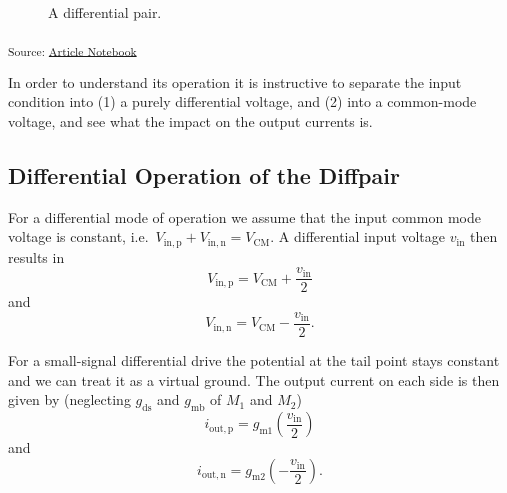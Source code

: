 \documentclass[
  a4paper,
  DIV=11,
  numbers=noendperiod]{scrartcl}
\begin{document}
\begin{figure}[H]


\caption{\label{fig-differential-pair}A differential pair.}

\end{figure}%

\textsubscript{Source:
\href{https://iic-jku.github.io/analog-circuit-design/index.qmd.html}{Article
Notebook}}

In order to understand its operation it is instructive to separate the
input condition into (1) a purely differential voltage, and (2) into a
common-mode voltage, and see what the impact on the output currents is.

\subsection{Differential Operation of the
Diffpair}\label{differential-operation-of-the-diffpair}

For a differential mode of operation we assume that the input common
mode voltage is constant,
i.e.~\(V_\mathrm{in,p} + V_\mathrm{in,n} = V_\mathrm{CM}\). A
differential input voltage \(v_\mathrm{in}\) then results in \[
V_\mathrm{in,p} = V_\mathrm{CM} + \frac{v_\mathrm{in}}{2}
\] and \[
V_\mathrm{in,n} = V_\mathrm{CM} - \frac{v_\mathrm{in}}{2}.
\]

For a small-signal differential drive the potential at the tail point
stays constant and we can treat it as a virtual ground. The output
current on each side is then given by (neglecting \(g_\mathrm{ds}\) and
\(g_\mathrm{mb}\) of \(M_1\) and \(M_2\)) \[
i_\mathrm{out,p} = g_\mathrm{m1} \left( \frac{v_\mathrm{in}}{2} \right)
\] and \[
i_\mathrm{out,n} = g_\mathrm{m2} \left( -\frac{v_\mathrm{in}}{2} \right).
\]
\end{document}
